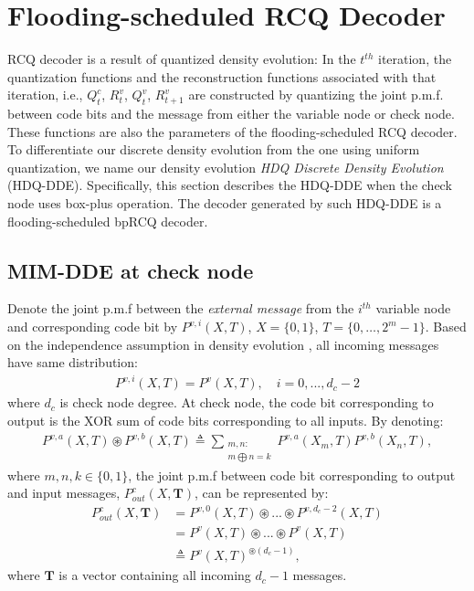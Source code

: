 \documentclass [PhD] {uclathes}
\begin{document}
\section{Flooding-scheduled RCQ Decoder}\label{sec: MIM-DDE}
RCQ decoder is a result of quantized density evolution: In the $t^{th}$ iteration, the quantization functions and the reconstruction functions associated with that iteration, i.e., $Q^c_{t}$, $R^v_t$, $Q^v_t$, $R^v_{t+1}$ are constructed by quantizing the joint p.m.f. between code bits and the message from either the variable node or check node. These functions are also the parameters of the flooding-scheduled RCQ decoder.  To differentiate our discrete density evolution from the one using uniform quantization\cite{Sae-Young_Chung2001-DDE0045}, we name our density evolution \textit{HDQ Discrete Density Evolution} (HDQ-DDE).  Specifically, this section describes the HDQ-DDE when the check node uses box-plus operation. The decoder generated by such HDQ-DDE is a flooding-scheduled bpRCQ decoder.

\subsection{MIM-DDE at check node}
Denote the joint p.m.f between the \textit{external message} from the $i^{th}$ variable node and corresponding code bit  by $P^{v,i}(X,T)$, $X=\{0,1\}$, $T=\{0,\ldots,2^m-1\}$. Based on the independence assumption in density evolution \cite{Richardson2001-de}, all incoming messages have same distribution:
\begin{align}
    P^{v,i} (X,T)=P^v(X,T),\quad i=0,...,d_c-2
\end{align}
where $d_c$ is check node degree. At check node, the code bit corresponding to output is the XOR sum of code bits corresponding to all inputs. By denoting:
\begin{align}
    P^{v,a}(X,T)\circledast P^{v,b}(X,T)\triangleq\sum_{\substack{m,n:\\m\bigoplus n=k} }P^{v,a}(X_m,T)P^{v,b}(X_n,T),
\end{align}
where $m,n,k\in\{0,1\}$, the joint p.m.f between code bit corresponding to output and input messages, $P^c_{out}(X,\mathbf{T})$, can be represented by:
\begin{align}
    P^c_{out}(X,\mathbf{T})&=P^{v,0}(X,T)\circledast ...\circledast P^{v,d_c-2}(X,T)\\
    &=P^{v}(X,T)\circledast ...\circledast P^{v}(X,T)\\
    &\triangleq P^v(X,T)^{\circledast(d_c-1)}, \label{equ: check_opt_prob}
\end{align}
where $\mathbf{T}$ is a vector containing all incoming $d_c-1$ messages.
\end{document}

